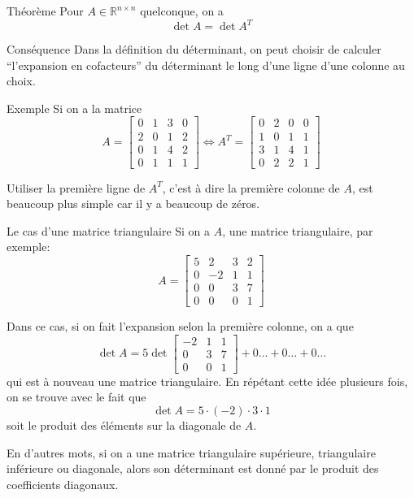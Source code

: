 \documentclass[a4paper]{article}
\begin{document}
\begin{parag}{Théorème}
    Pour $A \in\mathbb{R}^{n \times n}$ quelconque, on a
    \[\det A = \det A^{T}\]

    \begin{subparag}{Conséquence}
        Dans la définition du déterminant, on peut choisir de calculer ``l'expansion en cofacteurs'' du déterminant le long d'une ligne  d'une colonne au choix.
    \end{subparag}

    \begin{subparag}{Exemple}
        Si on a la matrice
        \[A = \begin{bmatrix} 0 & 1 & 3 & 0 \\ 2 & 0 & 1 & 2 \\ 0 & 1 & 4 & 2 \\ 0 & 1 & 1 & 1 \end{bmatrix} \iff A^T = \begin{bmatrix} 0 & 2 & 0 & 0 \\ 1 & 0 & 1 & 1 \\ 3 & 1 & 4 & 1 \\ 0 & 2 & 2 & 1 \end{bmatrix}\]

        Utiliser la première ligne de $A^T$, c'est à dire la première colonne de $A$, est beaucoup plus simple car il y a beaucoup de zéros.
    \end{subparag}

\end{parag}

\begin{parag}{Le cas d'une matrice triangulaire}
    Si on a $A$, une matrice triangulaire, par exemple:
    \[A = \begin{bmatrix} 5 & 2 & 3 & 2 \\ 0 & -2 & 1 & 1 \\ 0 & 0 & 3 & 7 \\ 0 & 0 & 0 & 1 \end{bmatrix} \]

    Dans ce cas, si on fait l'expansion selon la première colonne, on a que
    \[\det A = 5 \det \begin{bmatrix} -2 & 1 & 1 \\ 0 & 3 & 7 \\ 0 & 0 & 1 \end{bmatrix} + 0 \ldots + 0\ldots + 0\ldots\]
    qui est à nouveau une matrice triangulaire. En répétant cette idée plusieurs fois, on se trouve avec le fait que
    \[\det A = 5 \cdot \left(-2\right) \cdot 3 \cdot 1\]
    soit le produit des éléments sur la diagonale de $A$.

    En d'autres mots, si on a une matrice triangulaire supérieure, triangulaire inférieure ou diagonale, alors son déterminant est donné par le produit des coefficients diagonaux.
\end{parag}
\end{document}
